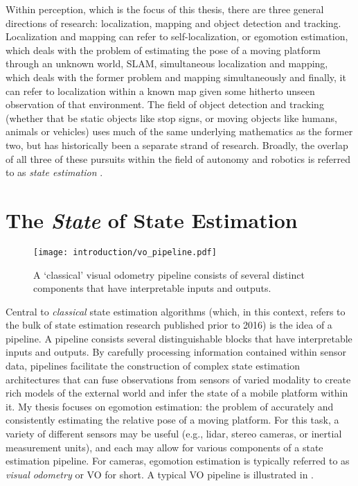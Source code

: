  Within perception, which is the focus of this thesis, there are three general directions of research: localization, mapping and object detection and tracking. Localization and mapping can refer to self-localization, or egomotion estimation, which deals with the problem of estimating the pose of a moving platform through an unknown world, SLAM, simultaneous localization and mapping, which deals with the former problem and mapping simultaneously and finally, it can refer to localization within a known map given some hitherto unseen observation of that environment. The field of object detection and tracking (whether that be static objects like stop signs, or moving objects like humans, animals or vehicles) uses much of the same underlying mathematics as the former two, but has historically been a separate strand of research. Broadly, the overlap of all three of these pursuits within the field of autonomy and robotics is referred to as \textit{state estimation} \citep{Barfoot2017-ri}.  


\section{The \textit{State} of State Estimation}

\begin{figure}
\begin{center}
		\texttt{[image: introduction/vo\_pipeline.pdf]}
		\caption{A `classical' visual odometry pipeline consists of several distinct components that have interpretable inputs and outputs.}
  	\label{fig:intro_vo_pipeline}
\end{center}
\end{figure}


Central to \textit{classical} state estimation algorithms (which, in this context, refers to the bulk of state estimation research published prior to 2016) is the idea of a pipeline. A pipeline consists several distinguishable blocks that have interpretable inputs and outputs.  By carefully processing information contained within sensor data, pipelines facilitate the construction of complex state estimation architectures that can fuse observations from sensors of varied modality to create rich models of the external world and infer the state of a mobile platform within it. My thesis focuses on egomotion estimation: the problem of accurately and consistently estimating the relative pose of a moving platform. For this task, a variety of different sensors may be useful (e.g., lidar, stereo cameras, or inertial measurement units), and each may allow for various components of a state estimation pipeline. For cameras, egomotion estimation is typically referred to as \textit{visual odometry} or VO for short. A typical VO pipeline is illustrated in . 




